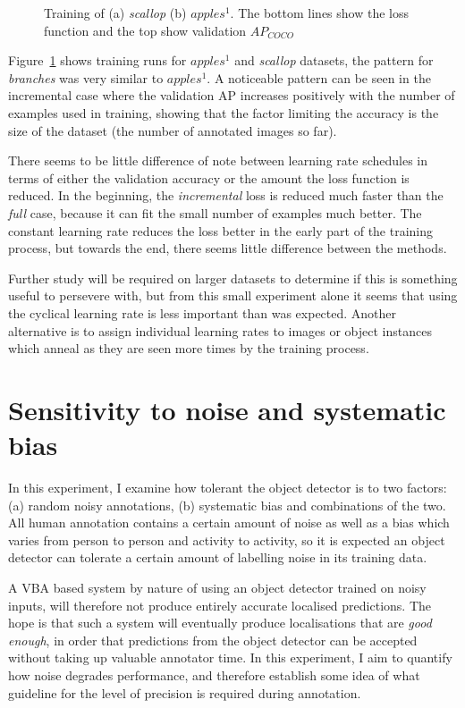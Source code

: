 \begin{figure}[htb]
\begin{subfigure}[t]{0.5\linewidth}
  \caption{}
\end{subfigure}
  \caption{Training of (a) \emph{scallop} (b) $apples^1$. The bottom lines show the loss function and the top show validation $AP_{COCO}$}  
  \label{fig:datasets_lr}
\end{figure}

Figure~\ref{fig:datasets_lr} shows training runs for $apples^1$ and \emph{scallop} datasets, the pattern for \emph{branches} was very similar to $apples^1$. A noticeable pattern can be seen in the incremental case where the validation \gls{AP} increases positively with the number of examples used in training, showing that the factor limiting the accuracy is the size of the dataset (the number of annotated images so far).

There seems to be little difference of note between learning rate schedules in terms of either the validation accuracy or the amount the loss function is reduced. In the beginning, the \emph{incremental} loss is reduced much faster than the \emph{full} case, because it can fit the small number of examples much better. The constant learning rate reduces the loss better in the early part of the training process, but towards the end, there seems little difference between the methods. 

Further study will be required on larger datasets to determine if this is something useful to persevere with, but from this small experiment alone it seems that using the cyclical learning rate is less important than was expected. Another alternative is to assign individual learning rates to images or object instances which anneal as they are seen more times by the training process.

\section{Sensitivity to noise and systematic bias}
\label{sec:noise_sensitivity}

In this experiment, I examine how tolerant the object detector is to two factors: (a) random noisy annotations, (b) systematic bias and combinations of the two. All human annotation contains a certain amount of noise as well as a bias which varies from person to person and activity to activity, so it is expected an object detector can tolerate a certain amount of labelling noise in its training data. 

A \gls{VBA} based system by nature of using an object detector trained on noisy inputs, will therefore not produce entirely accurate localised predictions. The hope is that such a system will eventually produce localisations that are \emph{good enough}, in order that predictions from the object detector can be accepted without taking up valuable annotator time. In this experiment, I aim to quantify how noise degrades performance, and therefore establish some idea of what guideline for the level of precision is required during annotation.

